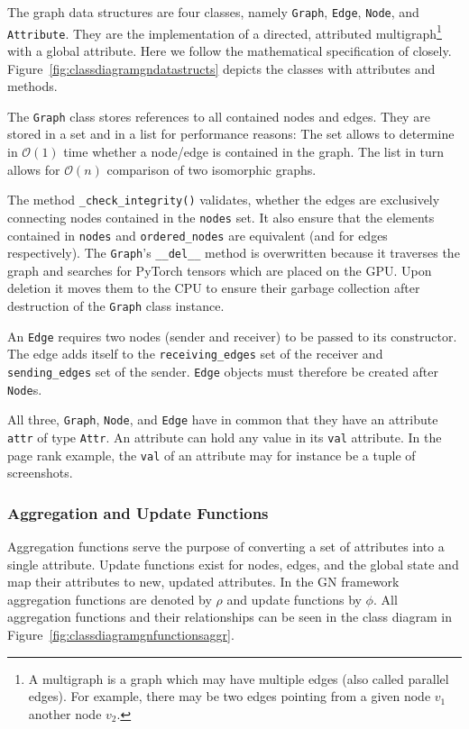 The graph data structures are four classes, namely \texttt{Graph}, \texttt{Edge}, \texttt{Node}, and \texttt{Attribute}. They are the implementation of a directed, attributed multigraph\footnote{A multigraph is a graph which may have multiple edges (also called parallel edges). For example, there may be two edges pointing from a given node $v_1$ another node $v_2$.} with a global attribute. Here we follow the mathematical specification of \cite{deepmind:graphnets} closely. Figure~\ref{fig:classdiagramgndatastructs} depicts the classes with attributes and methods.

The \texttt{Graph} class stores references to all contained nodes and edges. They are stored in a set and in a list for performance reasons: The set allows to determine in $\mathcal{O}(1)$ time whether a node/edge is contained in the graph. The list in turn allows for $\mathcal{O}(n)$ comparison of two isomorphic graphs.

The method \texttt{\_check\_integrity()} validates, whether the edges are exclusively connecting nodes contained in the \texttt{nodes} set. It also ensure that the elements contained in \texttt{nodes} and \texttt{ordered\_nodes} are equivalent (and for edges respectively). The \texttt{Graph}'s \texttt{\_\_del\_\_} method is overwritten because it traverses the graph and searches for PyTorch tensors which are placed on the GPU. Upon deletion it moves them to the CPU to ensure their garbage collection after destruction of the \texttt{Graph} class instance.

An \texttt{Edge} requires two nodes (sender and receiver) to be passed to its constructor. The edge adds itself to the \texttt{receiving\_edges} set of the receiver and \texttt{sending\_edges} set of the sender. \texttt{Edge} objects must therefore be created after \texttt{Node}s.

All three, \texttt{Graph}, \texttt{Node}, and \texttt{Edge} have in common that they have an attribute \texttt{attr} of type \texttt{Attr}. An attribute can hold any value in its \texttt{val} attribute. In the page rank example, the \texttt{val} of an attribute may for instance be a tuple of screenshots.

\subsubsection{Aggregation and Update Functions}

Aggregation functions serve the purpose of converting a set of attributes into a single attribute. Update functions exist for nodes, edges, and the global state and map their attributes to new, updated attributes. In the GN framework aggregation functions are denoted by $\rho$ and update functions by $\phi$. All aggregation functions and their relationships can be seen in the class diagram in Figure~\ref{fig:classdiagramgnfunctionsaggr}.

